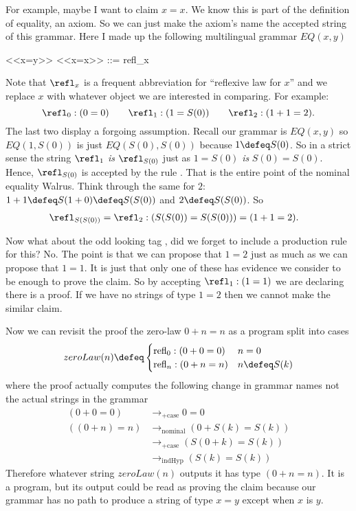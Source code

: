 For example, maybe I want to claim $x=x$.  We know 
this is part of the definition of equality, 
an axiom.  So we can just make the axiom's name the accepted 
string of this grammar.  Here I made up the following 
multilingual grammar $EQ(x,y)$
\begin{center}
\begin{Gcode}
<<x=y>>
<<x=x>> ::= refl_x
\end{Gcode}
\end{center}
Note that $\refl_x$ is a frequent abbreviation for ``reflexive law for $x$''
and we replace $x$ with whatever object we are interested in comparing.
For example:
\[
    \refl_0:(0=0)\qquad \refl_{1}:(1=S(0))
    \qquad \refl_{2}:(1+1=2).
\]
The last two display a forgoing assumption.
Recall our grammar is $EQ(x,y)$ so $EQ(1,S(0))$ is just $EQ(S(0),S(0))$ 
because $1\defeq S(0)$.  So in a strict sense
the string $\refl_1$ \emph{is} $\refl_{S(0)}$ just as $1=S(0)$ \emph{is}
$S(0)=S(0)$. Hence, $\refl_{S(0)}$ is accepted by the 
rule .  That is the entire point of the 
nominal equality Walrus.  Think through the same for $2$:
$1+1\defeq S(1+0)\defeq S(S(0))$ and $2\defeq S(S(0))$.  So 
\begin{align*}
    \refl_{S(S(0))} =\refl_2 & : (S(S(0))=S(S(0))) = (1+1=2).
\end{align*}


Now what about the odd looking tag , did we forget 
to include a production rule for this?  No.  The point is that 
we can propose that $1=2$ just as much as we can propose that $1=1$.
It is just that only one of these has evidence we consider to be 
enough to prove the claim.  So by accepting $\refl_1:(1=1)$ we 
are declaring there is a proof.  If we have no strings of type $1=2$ 
then we cannot make the similar claim.

Now we can revisit the proof the zero-law $0+n=n$ as a program 
split into cases
\[
    zeroLaw(n) \defeq \begin{cases}
        \text{refl}_0:(0+0=0) & n=0\\
        \text{refl}_n:(0+n=n) & n\defeq S(k)
    \end{cases}
\]
where the proof actually computes the following change in grammar names
not the actual strings in the grammar
\begin{align*}
    (0+0=0) & \longrightarrow_{+\text{case}} 0=0\\
    ((0+n)=n) & \longrightarrow_{\text{nominal}}  (0+S(k)=S(k))\\
     & \longrightarrow_{+\text{case}} (S(0+k)=S(k))\\
     & \longrightarrow_{\text{indHyp}} (S(k)=S(k))
\end{align*}
Therefore whatever string $zeroLaw(n)$ outputs it has type $(0+n=n)$.
It is a program, but its output could be read as proving the claim because 
our grammar has no path to produce a string of type $x=y$ except when $x$ is $y$.


